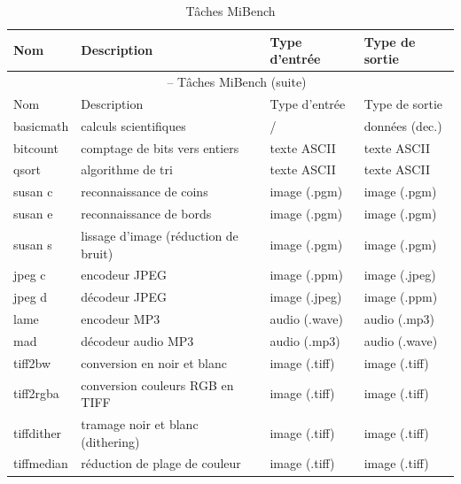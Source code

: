 \documentclass[french, a4paper, 11pt, twoside, pdftex]{StyleThese}
\begin{document}
\begin{longtable}{@{}llll@{}}
	\caption{Tâches MiBench}\label{tab:mibench_tasks} \\
		\toprule
		Nom          & Description                                  & Type d'entrée      & Type de sortie         \\ \midrule
	\endfirsthead
		\multicolumn{4}{c}{\tablename\ \thetable\ -- Tâches MiBench (suite)}\\[1ex]
		\toprule
		Nom          & Description                                  & Type d'entrée      & Type de sortie         \\ \midrule
	\endhead
		\bottomrule 
	\endfoot
		basicmath	 & calculs scientifiques				& /					 & données (dec.)	\\
		bitcount     & comptage de bits	vers entiers        & texte ASCII        & texte ASCII      \\
		qsort        & algorithme de tri                    & texte ASCII        & texte ASCII      \\
		susan c      & reconnaissance de coins              & image (.pgm)       & image (.pgm)     \\
		susan e      & reconnaissance de bords              & image (.pgm)       & image (.pgm)     \\
		susan s      & lissage d'image (réduction de bruit) & image (.pgm)       & image (.pgm)     \\
		jpeg c       & encodeur JPEG                        & image (.ppm)       & image (.jpeg)    \\
		jpeg d       & décodeur JPEG                        & image (.jpeg)      & image (.ppm)     \\
		lame         & encodeur MP3                         & audio (.wave)      & audio (.mp3)     \\
		mad          & décodeur audio MP3                   & audio (.mp3)       & audio (.wave)    \\
		tiff2bw      & conversion en noir et blanc          & image (.tiff)      & image (.tiff)    \\
		tiff2rgba    & conversion couleurs RGB en TIFF		& image (.tiff)      & image (.tiff)    \\
		tiffdither   & tramage noir et blanc (dithering)    & image (.tiff)      & image (.tiff)    \\
		tiffmedian   & réduction de plage de couleur      	& image (.tiff)      & image (.tiff)    \\

\end{longtable}
\end{document}
